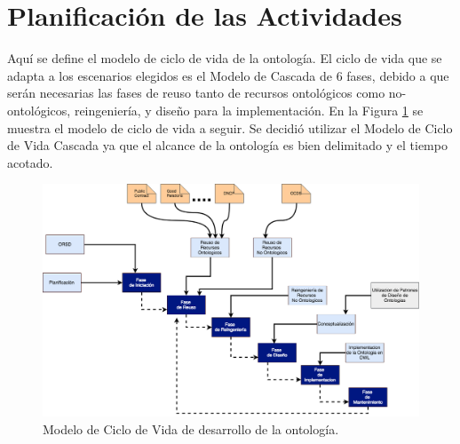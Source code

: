 \section{Planificación de las Actividades}

Aquí se define el modelo de ciclo de vida de la ontología. El ciclo de vida que se adapta a los escenarios elegidos es el Modelo de Cascada de 6 fases, debido a que serán necesarias las fases de reuso tanto de recursos ontológicos como no-ontológicos, reingeniería, y diseño para la implementación. En la Figura \ref{img:secuenciaDeDesarrollo} se muestra el modelo de ciclo de vida a seguir. Se decidió utilizar el Modelo de Ciclo de Vida Cascada ya que el alcance de la ontología es bien delimitado y el tiempo acotado.

\begin{figure}[ht!]
    \centering
    \includegraphics[width=150mm]{figuras/Diagramas-GraficodeSecuenciasDesarrollo.png}
    \caption{Modelo de Ciclo de Vida de desarrollo de la ontología.}
    \label{img:secuenciaDeDesarrollo}
\end{figure}


